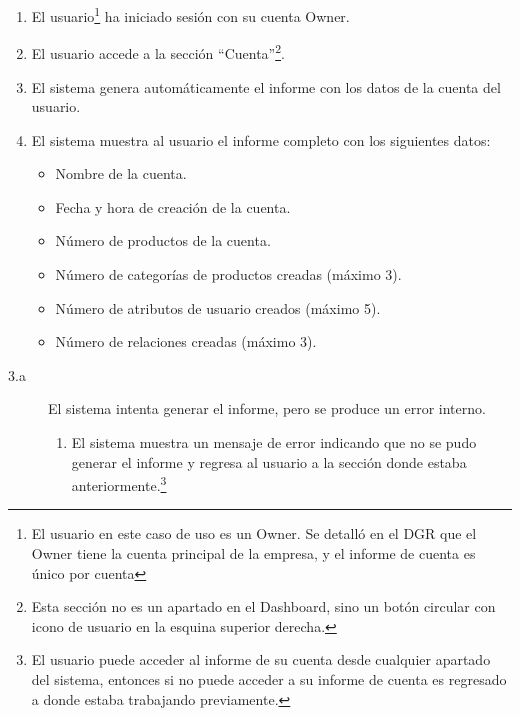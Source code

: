 \begin{enumerate}
    \item El usuario\footnote{El usuario en este caso de uso es un Owner. Se detalló en el DGR que el Owner tiene la cuenta principal de la empresa, y el informe de cuenta es único por cuenta} ha iniciado sesión con su cuenta Owner.
    \item El usuario accede a la sección \enquote{Cuenta}\footnote{Esta sección no es un apartado en el Dashboard, sino un botón circular con icono de usuario en la esquina superior derecha.}.
    \item El sistema genera automáticamente el informe con los datos de la cuenta del usuario.
    \item El sistema muestra al usuario el informe completo con los siguientes datos:
        \begin{itemize}
            \item Nombre de la cuenta.
            \item Fecha y hora de creación de la cuenta.
            \item Número de productos de la cuenta.
            \item Número de categorías de productos creadas (máximo 3).
            \item Número de atributos de usuario creados (máximo 5).
            \item Número de relaciones creadas (máximo 3).
        \end{itemize}
\end{enumerate}

\newpage %

\begin{description}        
    \item[3.a] El sistema intenta generar el informe, pero se produce un error interno.
    \begin{enumerate}
        \item[3.a.1] El sistema muestra un mensaje de error indicando que no se pudo generar el informe y regresa al usuario a la sección donde estaba anteriormente.\footnote{El usuario puede acceder al informe de su cuenta desde cualquier apartado del sistema, entonces si no puede acceder a su informe de cuenta es regresado a donde estaba trabajando previamente.}
    \end{enumerate}
\end{description}

